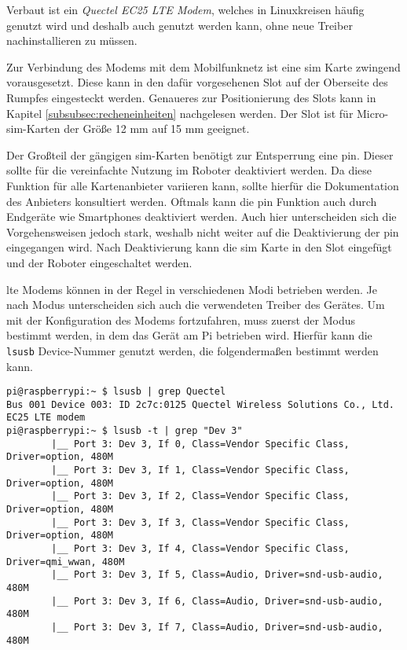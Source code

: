 Verbaut ist ein \emph{Quectel EC25 LTE Modem}, welches in Linuxkreisen häufig genutzt wird und deshalb auch
genutzt werden kann, ohne neue Treiber nachinstallieren zu müssen.


Zur Verbindung des Modems mit dem Mobilfunknetz ist eine \gls{sim} Karte zwingend vorausgesetzt.
Diese kann in den dafür vorgesehenen Slot auf der Oberseite des Rumpfes eingesteckt werden.
Genaueres zur Positionierung des Slots kann in Kapitel \ref{subsubsec:recheneinheiten} nachgelesen werden.
Der Slot ist für Micro-\gls{sim}-Karten der Größe \num{12} mm auf \num{15} mm geeignet.

Der Großteil der gängigen \gls{sim}-Karten benötigt zur Entsperrung eine \gls{pin}.
Dieser sollte für die vereinfachte Nutzung im Roboter deaktiviert werden.
Da diese Funktion für alle Kartenanbieter variieren kann, sollte hierfür die Dokumentation des Anbieters konsultiert werden.
Oftmals kann die \gls{pin} Funktion auch durch Endgeräte wie Smartphones deaktiviert werden.
Auch hier unterscheiden sich die Vorgehensweisen jedoch stark, weshalb nicht weiter auf die Deaktivierung der \gls{pin}
eingegangen wird.
Nach Deaktivierung kann die \gls{sim} Karte in den Slot eingefügt und der Roboter eingeschaltet werden.



\gls{lte} Modems können in der Regel in verschiedenen Modi betrieben werden.
Je nach Modus unterscheiden sich auch die verwendeten Treiber des Gerätes.
Um mit der Konfiguration des Modems fortzufahren, muss zuerst der Modus bestimmt werden, in dem das Gerät am Pi betrieben wird.
Hierfür kann die \texttt{lsusb} Device-Nummer genutzt werden, die folgendermaßen bestimmt werden kann.

\begin{lstlisting}
pi@raspberrypi:~ $ lsusb | grep Quectel
Bus 001 Device 003: ID 2c7c:0125 Quectel Wireless Solutions Co., Ltd. EC25 LTE modem
pi@raspberrypi:~ $ lsusb -t | grep "Dev 3"
        |__ Port 3: Dev 3, If 0, Class=Vendor Specific Class, Driver=option, 480M
        |__ Port 3: Dev 3, If 1, Class=Vendor Specific Class, Driver=option, 480M
        |__ Port 3: Dev 3, If 2, Class=Vendor Specific Class, Driver=option, 480M
        |__ Port 3: Dev 3, If 3, Class=Vendor Specific Class, Driver=option, 480M
        |__ Port 3: Dev 3, If 4, Class=Vendor Specific Class, Driver=qmi_wwan, 480M
        |__ Port 3: Dev 3, If 5, Class=Audio, Driver=snd-usb-audio, 480M
        |__ Port 3: Dev 3, If 6, Class=Audio, Driver=snd-usb-audio, 480M
        |__ Port 3: Dev 3, If 7, Class=Audio, Driver=snd-usb-audio, 480M
\end{lstlisting}

